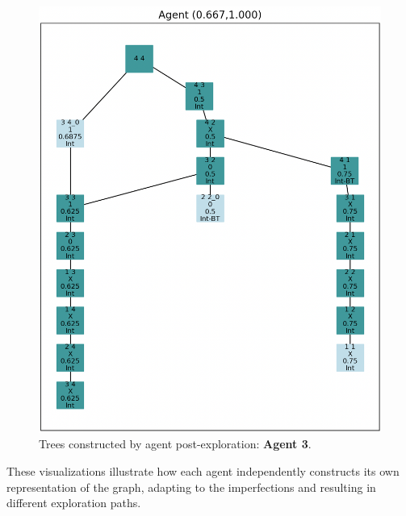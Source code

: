 \begin{figure}[H]
\centering
\includegraphics[width=1\textwidth]{Cap3/agent_3.png}
\caption{Trees constructed by agent post-exploration: \textbf{Agent 3}.}
\label{fig_agent_3_tree}
\end{figure}
    
These visualizations illustrate how each agent independently constructs its own representation of the graph,
adapting to the imperfections and resulting in different exploration paths.
    
    
    
    
    
    